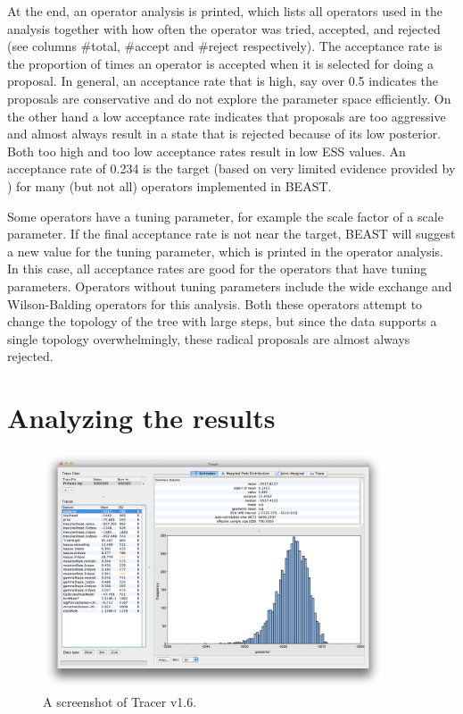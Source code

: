 \documentclass[11pt]{article}
\newcommand{\TracerVersion}{1.6}
\theoremstyle{plain}%
\theoremstyle{definition}
\theoremstyle{remark}
\begin{document}
At the end, an operator analysis is printed, which lists all operators used in the
analysis together with how often the operator was tried, accepted, and rejected
(see columns \#total, \#accept and \#reject respectively). The acceptance rate is
the proportion of times an operator is accepted when it is selected for doing a
proposal. In general, an acceptance rate that is high, say over 0.5 indicates the
proposals are conservative and do not explore the parameter space efficiently. On
the other hand a low acceptance rate indicates that proposals are too aggressive
and almost always result in a state that is rejected because of its low posterior.
Both too high and too low acceptance rates result in low ESS values. 
An acceptance rate of 0.234 is the target (based on very limited evidence provided by \cite{gelman1996efficient}) for many (but not all) operators implemented in BEAST.

Some operators have a tuning parameter, for example the scale factor of a
scale parameter. If the final acceptance rate is not near the target, BEAST will
suggest a new value for the tuning parameter, which is printed in the operator analysis. In this case, all acceptance rates are good for the operators that have tuning parameters. Operators without tuning parameters include the wide
exchange and Wilson-Balding operators for this analysis. Both these operators
attempt to change the topology of the tree with large steps, but since the data
supports a single topology overwhelmingly, these radical proposals are almost
always rejected.

\section{Analyzing the results}

\begin{figure}
\centering	
\includegraphics[width=0.9\textwidth]{figures/Tracer1}
\caption{A screenshot of Tracer v{\TracerVersion}.}
\label{fig:Tracer1}
\end{figure}
\end{document}
